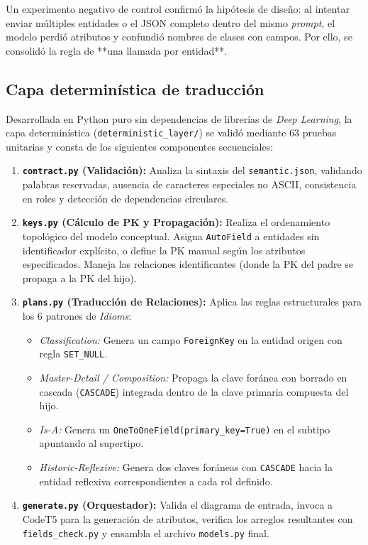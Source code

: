 Un experimento negativo de control confirmó la hipótesis de diseño: al intentar enviar múltiples entidades o el JSON completo dentro del mismo \textit{prompt}, el modelo perdió atributos y confundió nombres de clases con campos. Por ello, se consolidó la regla de **una llamada por entidad**.

\subsection{Capa determinística de traducción}
\label{subsec:p2-capa-deterministica}

Desarrollada en Python puro sin dependencias de librerías de \textit{Deep Learning}, la capa determinística (\texttt{deterministic\_layer/}) se validó mediante 63 pruebas unitarias y consta de los siguientes componentes secuenciales:

\begin{enumerate}
    \item \textbf{\texttt{contract.py} (Validación):} Analiza la sintaxis del \texttt{semantic.json}, validando palabras reservadas, ausencia de caracteres especiales no ASCII, consistencia en roles y detección de dependencias circulares.
    \item \textbf{\texttt{keys.py} (Cálculo de PK y Propagación):} Realiza el ordenamiento topológico del modelo conceptual. Asigna \texttt{AutoField} a entidades sin identificador explícito, o define la PK manual según los atributos especificados. Maneja las relaciones identificantes (donde la PK del padre se propaga a la PK del hijo).
    \item \textbf{\texttt{plans.py} (Traducción de Relaciones):} Aplica las reglas estructurales para los 6 patrones de \textit{Idioms}:
    \begin{itemize}
        \item \textit{Classification:} Genera un campo \texttt{ForeignKey} en la entidad origen con regla \texttt{SET\_NULL}.
        \item \textit{Master-Detail / Composition:} Propaga la clave foránea con borrado en cascada (\texttt{CASCADE}) integrada dentro de la clave primaria compuesta del hijo.
        \item \textit{Is-A:} Genera un \texttt{OneToOneField(primary\_key=True)} en el subtipo apuntando al supertipo.
        \item \textit{Historic-Reflexive:} Genera dos claves foráneas con \texttt{CASCADE} hacia la entidad reflexiva correspondientes a cada rol definido.
    \end{itemize}
    \item \textbf{\texttt{generate.py} (Orquestador):} Valida el diagrama de entrada, invoca a CodeT5 para la generación de atributos, verifica los arreglos resultantes con \texttt{fields\_check.py} y ensambla el archivo \texttt{models.py} final.
\end{enumerate}

